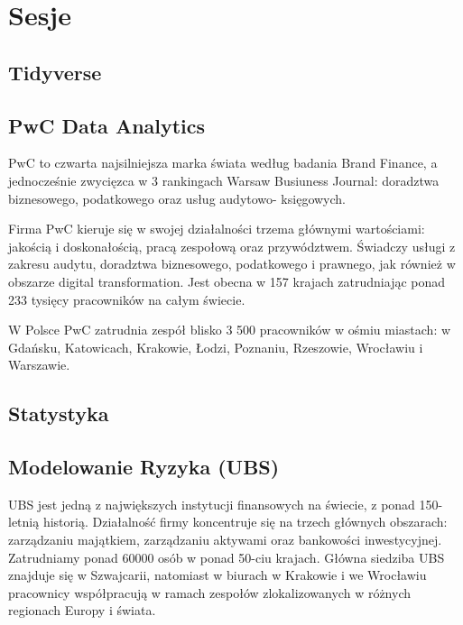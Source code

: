 \documentclass[11pt,twoside,b5paper]{book}
\begin{document}
\chapter{Sesje}{\LARGE}
\section{Tidyverse}{}





\newpage
\section{PwC Data Analytics}
PwC to czwarta najsilniejsza marka świata według badania Brand Finance, a jednocześnie zwycięzca w 3 rankingach Warsaw Busiuness Journal: doradztwa biznesowego, podatkowego oraz usług audytowo- księgowych.

Firma PwC kieruje się w swojej działalności trzema głównymi wartościami: jakością i doskonałością, pracą zespołową oraz przywództwem. Świadczy usługi z zakresu audytu, doradztwa biznesowego, podatkowego i prawnego, jak również w obszarze digital transformation. Jest obecna w 157 krajach zatrudniając ponad 233 tysięcy pracowników na całym świecie.

W Polsce PwC zatrudnia zespół blisko 3 500 pracowników w ośmiu miastach: w Gdańsku, Katowicach, Krakowie, Łodzi, Poznaniu, Rzeszowie, Wrocławiu i Warszawie.

\newpage

\newpage
\section{Statystyka}





\newpage
\section{Modelowanie Ryzyka (UBS)}
UBS jest jedną z największych instytucji finansowych na świecie, z ponad 150-letnią historią. Działalność firmy koncentruje się na trzech głównych obszarach: zarządzaniu majątkiem, zarządzaniu aktywami oraz bankowości inwestycyjnej. Zatrudniamy ponad 60000 osób w ponad 50-ciu krajach. Główna siedziba UBS znajduje się w Szwajcarii, natomiast w biurach w Krakowie i we Wrocławiu pracownicy współpracują w ramach zespołów zlokalizowanych w różnych regionach Europy i świata.
\end{document}
